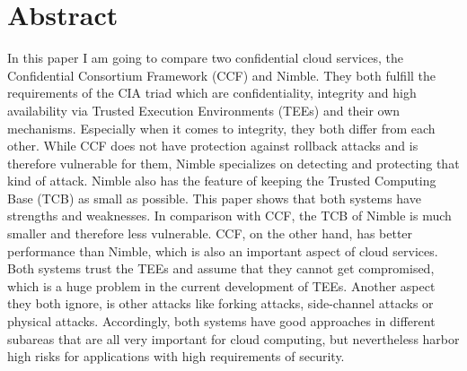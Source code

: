 \section*{Abstract}	
 In this paper I am going to compare two confidential cloud services, the Confidential Consortium Framework (CCF) and Nimble. They both fulfill the requirements of the CIA triad which are confidentiality, integrity and high availability via Trusted Execution Environments (TEEs) and their own mechanisms. Especially when it comes to integrity, they both differ from each other. While CCF does not have protection against rollback attacks and is therefore vulnerable for them, Nimble specializes on detecting and protecting that kind of attack. Nimble also has the feature of keeping the Trusted Computing Base (TCB) as small as possible. This paper shows that both systems have strengths and weaknesses. In comparison with CCF, the TCB of Nimble is much smaller and therefore less vulnerable. CCF, on the other hand, has better performance than Nimble, which is also an important aspect of cloud services. Both systems trust the TEEs and assume that they cannot get compromised, which is a huge problem in the current development of TEEs. Another aspect they both ignore, is other attacks like forking attacks, side-channel attacks or physical attacks. Accordingly, both systems have good approaches in different subareas that are all very important for cloud computing, but nevertheless harbor high risks for applications with high requirements of security.\\